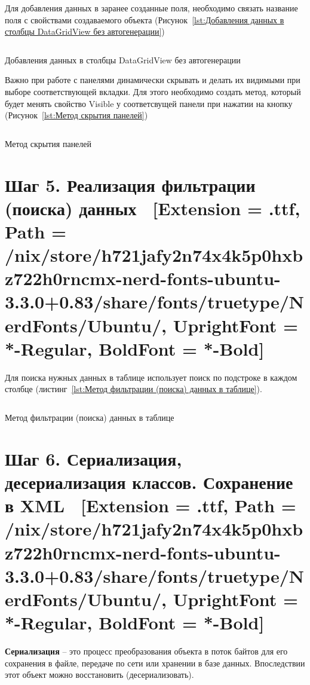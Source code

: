 \documentclass[12pt]{article}
\newcommand{\icon}[1]{\fontspec{UbuntuNerdFont}[Extension = .ttf,
  Path = /nix/store/h721jafy2n74x4k5p0hxbz722h0rncmx-nerd-fonts-ubuntu-3.3.0+0.83/share/fonts/truetype/NerdFonts/Ubuntu/,
  UprightFont = *-Regular,
BoldFont = *-Bold] #1}
\newcommand{\iicon}[1]{{\icon{#1}}}
\renewcommand{\texttt}[1]{{\small\ttfamily #1}}
\numberwithin{listing}{section}
\numberwithin{figure}{section}
\begin{document}
Для добавления данных в заранее созданные поля, необходимо связать название поля с свойствами создаваемого объекта (Рисунок~\ref{lst:Добавления данных в столбцы DataGridView без автогенерации})

\begin{listing}[H]
	\inputminted[firstline=138, lastline=155]{csharp}{../../2lab/WinFormsApp1example_/Form1.cs}
	\caption{Добавления данных в столбцы \texttt{DataGridView} без автогенерации}
	\label{lst:Добавления данных в столбцы DataGridView без автогенерации}
\end{listing}

Важно при работе с панелями динамически скрывать и делать их видимыми при выборе соответствующей вкладки. Для этого необходимо создать метод, который будет менять свойство \texttt{Visible} у соответсвущей панели при нажатии на кнопку (Рисунок~\ref{lst:Метод скрытия панелей})

\begin{listing}[H]
	\inputminted[firstline = 100, lastline=131]{csharp}{../../2lab/WinFormsApp1example_/Form1.cs}
	\caption{Метод скрытия панелей}
	\label{lst:Метод скрытия панелей}
\end{listing}

\newpage

\section{Шаг 5. Реализация фильтрации (поиска) данных \ \texorpdfstring{{\small{\iicon{}}}}{}}
Для поиска нужных данных в таблице использует поиск по подстроке в каждом столбце (листинг~\ref{lst:Метод фильтрации (поиска) данных в таблице}).

\begin{listing}[H]
	\inputminted[firstline = 280, lastline=341, fontsize={\fontsize{8}{8}}]{csharp}{../../2lab/WinFormsApp1example_/Form1.cs}
	\caption{Метод фильтрации (поиска) данных в таблице}
	\label{lst:Метод фильтрации (поиска) данных в таблице}
\end{listing}

\newpage

\section{Шаг 6. Сериализация, десериализация классов. Сохранение в XML \ \texorpdfstring{{\small{\iicon{}}}}{}}

\textbf{Сериализация} -- это процесс преобразования объекта в поток байтов для его сохранения в файле, передаче по сети или хранении в базе данных. Впоследствии этот объект можно восстановить (десериализовать).
\end{document}
